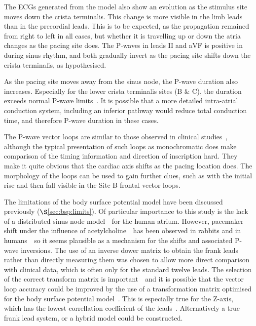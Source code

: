 The ECGs generated from the model also show an evolution as the stimulus site
moves down the crista terminalis.
This change is more visible in the limb leads than in the precordial leads.
This is to be expected, as the propagation remained from right to left in all
cases, but whether it is travelling up or down the atria changes as the pacing
site does.
The P-waves in leads II and aVF is positive in during sinus rhythm, and both
gradually invert as the pacing site shifts down the crista terminalis, as
hypothesised.

As the pacing site moves away from the sinus node, the P-wave duration also
increases.
Especially for the lower crista terminalis sites (B \& C), the duration exceeds
normal P-wave limits~\cite{Lemery2004,MacFarlane1989}.
It is possible that a more detailed intra-atrial conduction system, including an
inferior pathway would reduce total conduction time, and therefore P-wave
duration in these cases.

The P-wave vector loops are similar to those observed in clinical
studies~\cite{Carlson2005,Holmqvist2007,Havmoller2007,Guillem2007}, although the typical
presentation of such loops as monochromatic does make comparison of the timing
information and direction of inscription hard.
They make it quite obvious that the cardiac axis shifts as the pacing location
does.
The morphology of the loops can be used to gain further clues, such as with the
initial rise and then fall visible in the Site B frontal vector loops.

The limitations of the body surface potential model have been discussed
previously ($\S$\ref{sec:bsp:limits}).
Of particular importance to this study is the lack of a distributed sinus node
model~\cite{Yamamoto2007,Dobrzynski2005}\ for the human atrium.
However, pacemaker shift under the influence of
acetylcholine~\cite{Shibata2001}\ has been observed in rabbits and in
humans~\cite{Opthof1988}\ so it seems plausible as a mechanism for the shifts
and associated P-wave inversions.
The use of an inverse dower matrix to obtain the frank leads rather than
directly measuring them was chosen to allow more direct comparison with clinical
data, which is often only for the standard twelve leads.
The selection of the correct transform matrix is
important~\cite{Guillem2007,Luo1991,Hyttinen1995}\ and it is possible that the
vector loop accuracy could be improved by the use of a transformation matrix
optimised for the body surface potential model~\cite{vanOosterom2007??}.
This is especially true for the Z-axis, which has the lowest correllation
coefficient of the leads~\cite{Hyttinen1995}.
Alternatively a true frank lead system, or a hybrid model could be constructed.

